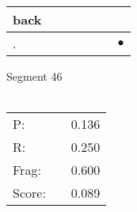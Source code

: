 \documentclass[landscape]{article}
\newcommand{\ssp}{\hspace{2pt}}
\newcommand{\mex}{\cellcolor{g}$\bullet$}
\begin{document}
\begin{tabular}{|l|p{10pt}|p{10pt}|p{10pt}|p{10pt}|p{10pt}|p{10pt}|}
\hline
\ssp back \ssp&\hspace{2pt}&\hspace{2pt}&\hspace{2pt}&\hspace{2pt}&\hspace{2pt}&\hspace{2pt}\\
\hline
\ssp \cellcolor{ref5}. \ssp&\hspace{2pt}&\hspace{2pt}&\hspace{2pt}&\hspace{2pt}&\hspace{2pt}&\hspace{2pt}\mex\\
\hline
\end{tabular}

\vspace{6pt}
\noindent Segment 46\\\\
\noindent\begin{tabular}{lm{12pt}r}
\hline
P:&&0.136\\
R:&&0.250\\
Frag:&&0.600\\
Score:&&0.089\\
\end{tabular}

\newpage
\end{document}
